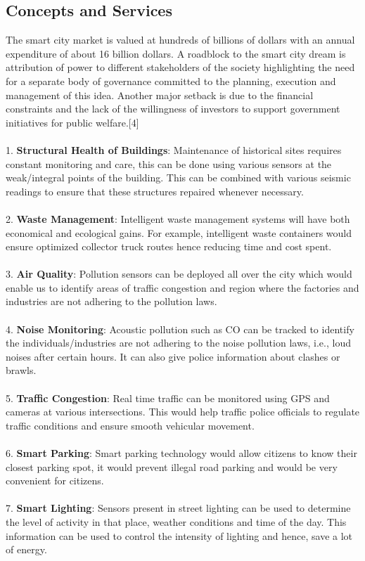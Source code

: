 \documentclass[conference]{IEEEtran}
\begin{document}
\subsection{Concepts and Services}
The smart city market is valued at hundreds of billions of dollars with an annual expenditure of about 16 billion dollars. A roadblock to the smart city dream is attribution of power to different stakeholders of the society highlighting the need for a separate body of governance committed to the planning, execution and management of this idea. Another major setback is due to the financial constraints and the lack of the willingness of investors to support government initiatives for public welfare.[4] \\\\
1. \textbf{Structural Health of Buildings}: Maintenance of historical sites requires constant monitoring and care, this can be done using various sensors at the weak/integral points of the building. This can be combined with various seismic readings to ensure that these structures repaired whenever necessary.\\\\
2. \textbf{Waste Management}: Intelligent waste management systems will have both economical and ecological gains. For example, intelligent waste containers would ensure optimized collector truck routes hence reducing time and cost spent. \\\\
3. \textbf{Air Quality}: Pollution sensors can be deployed all over the city which would enable us to identify areas of traffic congestion and region where the factories and industries are not adhering to the pollution laws.\\\\
4. \textbf{Noise Monitoring}: Acoustic pollution such as CO can be tracked to identify the  individuals/industries are not adhering to the noise pollution laws, i.e., loud noises after certain hours. It can also give police information about clashes or brawls. \\\\
5. \textbf{Traffic Congestion}: Real time traffic can be monitored using GPS and cameras at various intersections. This would help traffic police officials to regulate traffic conditions and ensure smooth vehicular movement.\\\\
6. \textbf{Smart Parking}: Smart parking technology would allow citizens to know their closest parking spot, it would prevent illegal road parking and would be very convenient for citizens.\\\\
7. \textbf{Smart Lighting}: Sensors present in street lighting can be used to determine the level of activity in that place, weather conditions and time of the day. This information can be used to control the intensity of lighting and hence, save a lot of energy. 
\end{document}
